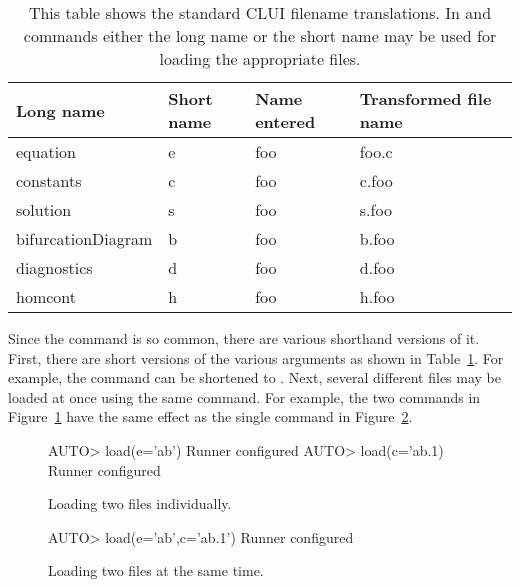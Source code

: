 \begin{table}[htbp]
\begin{center}
\begin{tabular}{| l | l | l | l |}
\hline
Long name & Short name & Name entered & Transformed file name \\
\hline
equation  & e          & foo          &foo.c \\
\hline
constants  & c          & foo          & c.foo \\
\hline
solution  & s          & foo          & s.foo \\
\hline
bifurcationDiagram  & b          & foo          &b.foo \\
\hline
diagnostics  & d          & foo          &d.foo \\
\hline
homcont  & h          & foo          &h.foo \\
\hline
\end{tabular}
\caption[Standard \AUTOc CLUI filename translations.]
{This table shows the standard \AUTOc CLUI filename
translations.  In  and 
commands either the long name or the short name may be
used for loading the appropriate files.}
\label{tbl:clui_filename_translation}
\end{center}
\end{table}

Since the  command is so common, there are
various shorthand versions of it.  First, there are short versions
of the various arguments as shown in Table~\ref{tbl:clui_filename_translation}.
For example, the command  can 
be shortened to .
Next, several different
files may be loaded at once using the same  command.
For example, the two commands in Figure~\ref{exa:clui_two_command}
have the same effect as the single command in 
Figure~\ref{exa:clui_one_command}.

\begin{figure}[htbp]
{\small \begin{center} \begin{boxedverbatim}
AUTO> load(e='ab')
Runner configured
AUTO> load(c='ab.1)
Runner configured
\end{boxedverbatim}
\end{center} 
}
\caption[Loading two files individually]
{Loading two files individually.}
\label{exa:clui_two_command}
\end{figure}

\begin{figure}[htbp]
{\small \begin{center} \begin{boxedverbatim}
AUTO> load(e='ab',c='ab.1')
Runner configured
\end{boxedverbatim}
\end{center} 
}
\caption[Loading two files at the same time]
{Loading two files at the same time.}
\label{exa:clui_one_command}
\end{figure}

